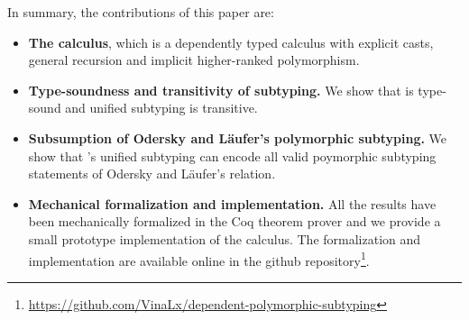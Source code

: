 In summary, the contributions of this paper are:

\begin{itemize}

\item {\bf The \name calculus}, which is a dependently typed calculus with explicit casts,
  general recursion and implicit higher-ranked polymorphism.

\item {\bf Type-soundness and transitivity of subtyping.} We show that \name
  is type-sound and unified subtyping is transitive.

\item {\bf Subsumption of Odersky and L\"aufer's polymorphic subtyping.} We show that \name's
  unified subtyping can encode all valid poymorphic subtyping statements of Odersky and L\"aufer's
  relation.

\item {\bf Mechanical formalization and implementation.} All the results have been mechanically
  formalized in the Coq theorem prover and we provide a small prototype implementation of the
  calculus. The formalization and implementation are available online in the
  github repository\footnote{\url{https://github.com/VinaLx/dependent-polymorphic-subtyping}}.

\end{itemize}
